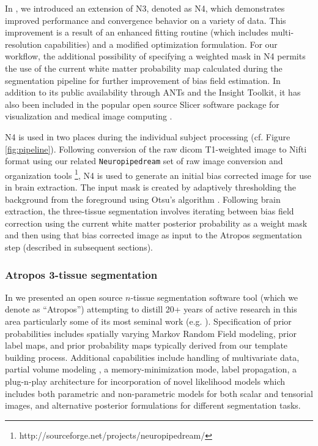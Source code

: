 In \cite{tustison2010}, we introduced an extension of N3, denoted as
N4, which demonstrates improved performance and convergence behavior
on a variety of data.  This improvement is a result of an enhanced 
fitting routine (which includes multi-resolution capabilities) and a modified optimization 
formulation.  For our workflow, the additional possibility of specifying
a weighted mask in N4 permits the use of the current white matter probability map 
calculated during the segmentation pipeline for further improvement of 
bias field estimation.  In addition to its public availability 
through ANTs and the Insight Toolkit, it has also been included in
the popular open source Slicer software package for visualization and medical
image computing \cite{fedorov2011}.

N4 is used in two places during the individual subject processing (cf. Figure
\ref{fig:pipeline}).  Following conversion of the raw dicom T1-weighted image
to Nifti format using our related \verb#Neuropipedream# set of raw image conversion
and organization tools%
\footnote{
http://sourceforge.net/projects/neuropipedream/
}, N4 is used to generate an initial bias corrected image for use in
brain extraction.  The input mask is created by adaptively thresholding 
the background from the foreground using Otsu's algorithm \cite{otsu1979}.
Following brain extraction, the three-tissue segmentation involves iterating
between bias field correction using the current white matter posterior 
probability as a weight mask and then using that bias corrected image
as input to the Atropos segmentation step (described in subsequent sections). 

\subsubsection{Atropos 3-tissue segmentation}

In \cite{avants2011a} we presented an open source $n$-tissue segmentation software tool
(which we denote as ``Atropos'') attempting to distill 20+ years of active research in this area
particularly some of its most seminal work (e.g. \cite{zhang2001,ashburner2005}). 
Specification of prior probabilities includes spatially varying Markov Random Field modeling, 
prior label maps, and prior probability maps typically derived from our template building 
process.  Additional
capabilities include handling of multivariate data, 
partial volume modeling \cite{shattuck2001}, a memory-minimization mode,
label propagation, a plug-n-play architecture for incorporation of novel likelihood models
which includes both parametric and non-parametric models for both scalar and tensorial
images, and alternative posterior formulations for different segmentation tasks.

